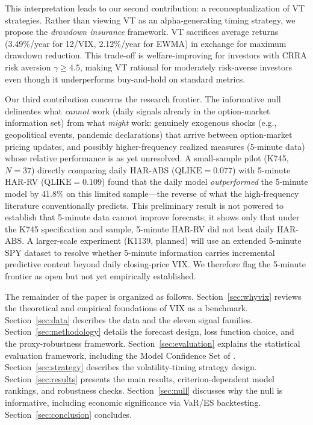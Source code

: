 \documentclass[12pt,a4paper]{article}
\begin{document}
This interpretation leads to our second contribution: a reconceptualization of VT strategies. Rather than viewing VT as an alpha-generating timing strategy, we propose the \emph{drawdown insurance} framework. VT sacrifices average returns (3.49\%/year for 12/VIX, 2.12\%/year for EWMA) in exchange for maximum drawdown reduction. This trade-off is welfare-improving for investors with CRRA risk aversion $\gamma \geq 4.5$, making VT rational for moderately risk-averse investors even though it underperforms buy-and-hold on standard metrics.

Our third contribution concerns the research frontier. The informative null delineates what \emph{cannot} work (daily signals already in the option-market information set) from what \emph{might} work: genuinely exogenous shocks (e.g., geopolitical events, pandemic declarations) that arrive between option-market pricing updates, and possibly higher-frequency realized measures (5-minute data) whose relative performance is as yet unresolved. A small-sample pilot (K745, $N = 37$) directly comparing daily HAR-ABS ($\text{QLIKE} = 0.077$) with 5-minute HAR-RV ($\text{QLIKE} = 0.109$) found that the daily model \emph{outperformed} the 5-minute model by 41.8\% on this limited sample---the reverse of what the high-frequency literature conventionally predicts. This preliminary result is not powered to establish that 5-minute data cannot improve forecasts; it shows only that under the K745 specification and sample, 5-minute HAR-RV did not beat daily HAR-ABS. A larger-scale experiment (K1139, planned) will use an extended 5-minute SPY dataset to resolve whether 5-minute information carries incremental predictive content beyond daily closing-price VIX. We therefore flag the 5-minute frontier as open but not yet empirically established.

The remainder of the paper is organized as follows. Section~\ref{sec:whyvix} reviews the theoretical and empirical foundations of VIX as a benchmark. Section~\ref{sec:data} describes the data and the eleven signal families. Section~\ref{sec:methodology} details the forecast design, loss function choice, and the \citet{patton2011} proxy-robustness framework. Section~\ref{sec:evaluation} explains the statistical evaluation framework, including the Model Confidence Set of \citet{hansen2011mcs}. Section~\ref{sec:strategy} describes the volatility-timing strategy design. Section~\ref{sec:results} presents the main results, criterion-dependent model rankings, and robustness checks. Section~\ref{sec:null} discusses why the null is informative, including economic significance via VaR/ES backtesting. Section~\ref{sec:conclusion} concludes.
\end{document}
